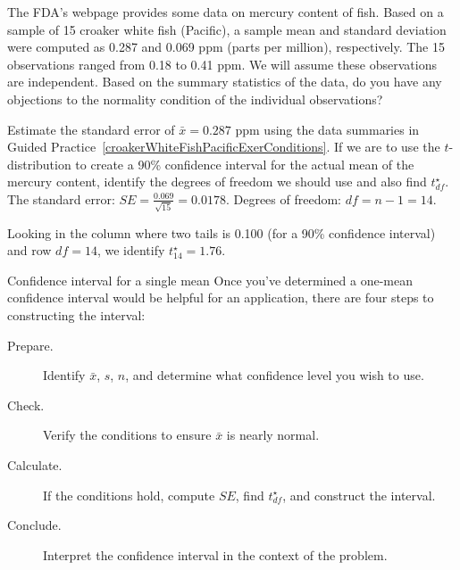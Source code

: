 \begin{exercisewrap}
\begin{nexercise} \label{croakerWhiteFishPacificExerConditions}
The FDA's webpage provides some data on mercury content of fish. Based on a sample of 15 croaker white fish (Pacific), a sample mean and standard deviation were computed as 0.287 and 0.069 ppm (parts per million), respectively. The 15 observations ranged from 0.18 to 0.41 ppm. We will assume these observations are independent. Based on the summary statistics of the data, do you have any objections to the normality condition of the individual observations?\footnotemark{}
\end{nexercise}
\end{exercisewrap}

\begin{examplewrap}
\begin{nexample}{Estimate the standard error of $\bar{x}=0.287$ ppm using the data summaries in Guided Practice~\ref{croakerWhiteFishPacificExerConditions}. If we are to use the $t$-distribution to create a 90\% confidence interval for the actual mean of the mercury content, identify the degrees of freedom we should use and also find $t^{\star}_{df}$.}
\label{croakerWhiteFishPacificExerSEDFTStar}
The standard error: $SE = \frac{0.069}{\sqrt{15}} = 0.0178$. Degrees of freedom: $df = n - 1 = 14$.

Looking in the column where two tails is 0.100 (for a 90\% confidence interval) and row $df=14$, we identify $t^{\star}_{14} = 1.76$.
\end{nexample}
\end{examplewrap}

\begin{onebox}{Confidence interval for a single mean}
  Once you've determined a one-mean confidence interval
  would be helpful for an application,
  there are four steps to constructing the interval:
  \begin{description}
  \item[Prepare.]
      Identify $\bar{x}$, $s$, $n$, and determine what
      confidence level you wish to use.
  \item[Check.]
      Verify the conditions to ensure $\bar{x}$
      is nearly normal.
  \item[Calculate.]
      If the conditions hold, compute $SE$,
      find $t_{df}^{\star}$, and construct the interval.
  \item[Conclude.]
      Interpret the confidence interval in the context
      of the problem.
  \end{description}
\end{onebox}

